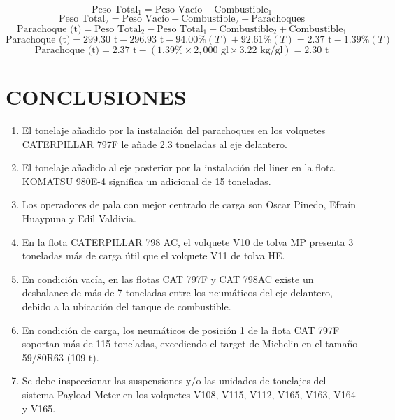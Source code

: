 \documentclass[11pt,a4paper]{article}
\begin{document}
\begin{equation}
\text{Peso Total}_1 = \text{Peso Vacío} + \text{Combustible}_1
\end{equation}
\begin{equation}
\text{Peso Total}_2 = \text{Peso Vacío} + \text{Combustible}_2 + \text{Parachoques}
\end{equation}
\begin{equation}
\text{Parachoque (t)} = \text{Peso Total}_2 - \text{Peso Total}_1 - \text{Combustible}_2 + \text{Combustible}_1
\end{equation}
\begin{equation}
\text{Parachoque (t)} = 299.30\text{ t} - 296.93\text{ t} - 94.00\%(T) + 92.61\%(T) = 2.37\text{ t} - 1.39\%(T)
\end{equation}
\begin{equation}
\text{Parachoque (t)} = 2.37\text{ t} - (1.39\% \times 2,000\text{ gl} \times 3.22\text{ kg/gl}) = 2.30\text{ t}
\end{equation}

\section{CONCLUSIONES}
\begin{enumerate}[label=\arabic*.]
    \item El tonelaje añadido por la instalación del parachoques en los volquetes CATERPILLAR 797F le añade 2.3 toneladas al eje delantero.
    \item El tonelaje añadido al eje posterior por la instalación del liner en la flota KOMATSU 980E-4 significa un adicional de 15 toneladas.
    \item Los operadores de pala con mejor centrado de carga son Oscar Pinedo, Efraín Huaypuna y Edil Valdivia.
    \item En la flota CATERPILLAR 798 AC, el volquete V10 de tolva MP presenta 3 toneladas más de carga útil que el volquete V11 de tolva HE.
    \item En condición vacía, en las flotas CAT 797F y CAT 798AC existe un desbalance de más de 7 toneladas entre los neumáticos del eje delantero, debido a la ubicación del tanque de combustible.
    \item En condición de carga, los neumáticos de posición 1 de la flota CAT 797F soportan más de 115 toneladas, excediendo el target de Michelin en el tamaño 59/80R63 (109 t).
    \item Se debe inspeccionar las suspensiones y/o las unidades de tonelajes del sistema Payload Meter en los volquetes V108, V115, V112, V165, V163, V164 y V165.
\end{enumerate}
\end{document}
